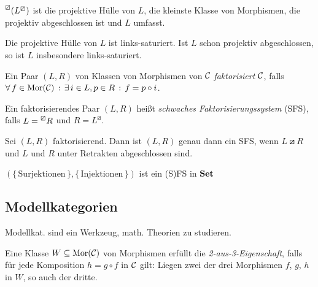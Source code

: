 \documentclass{cheat-sheet}
\newcommand{\lhhe}{\boxslash} %
\begin{document}
\begin{prop}
  $\prescript{\lhhe}{}(L^\lhhe)$ ist die projektive Hülle von $L$, \dh{} die kleinste Klasse von Morphismen, die projektiv abgeschlossen ist und $L$ umfasst.
\end{prop}

\begin{prop}
  Die projektive Hülle von $L$ ist links-saturiert. Ist $L$ schon projektiv abgeschlossen, so ist $L$ insbesondere links-saturiert.
\end{prop}

\begin{defn}
  Ein Paar $(L, R)$ von Klassen von Morphismen von $\mathcal{C}$ \emph{faktorisiert} $\mathcal{C}$, falls
  $\forall \, {f \in \operatorname{Mor}(\mathcal{C})} \,:\, \exists \, {i \in L, p \in R} \,:\, f = p \circ i$.
\end{defn}

\begin{defn}
  Ein faktorisierendes Paar $(L, R)$ heißt \emph{schwaches Faktorisierungssystem} (SFS), falls $L = \prescript{\lhhe}{} R$ und $R = L^\lhhe$.
\end{defn}

\begin{prop}
  Sei $(L, R)$ faktorisierend. Dann ist $(L, R)$ genau dann ein SFS, wenn $L \lhhe R$ und $L$ und $R$ unter Retrakten abgeschlossen sind.
\end{prop}

\begin{bsp}
  $(\{ \, \text{Surjektionen} \, \}, \{ \, \text{Injektionen} \, \})$ ist ein (S)FS in $\mathbf{Set}$
\end{bsp}


\subsection{Modellkategorien}

\begin{motto}
  Modellkat. sind ein Werkzeug, math. Theorien zu studieren.
\end{motto}

\begin{defn}
  Eine Klasse $W \subseteq \operatorname{Mor}(\mathcal{C})$ von Morphismen erfüllt die \emph{2-aus-3-Eigenschaft}, falls für jede Komposition $h = g \circ f$ in $\mathcal{C}$ gilt: Liegen zwei der drei Morphismen $f$, $g$, $h$ in $W$, so auch der dritte.
\end{defn}
\end{document}
